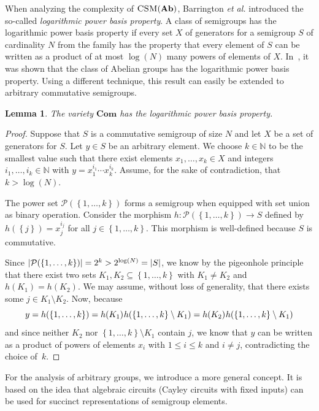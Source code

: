 \documentclass[11pt]{article}
\numberwithin{equation}{section}
\newtheorem{lemma}[theorem]{Lemma}
\theoremstyle{definition}
\theoremstyle{plain}
\newcommand{\N}{\mathbb N}
\renewcommand{\leq}{\leqslant}
\renewcommand{\le}{\leq}
\newcommand{\abs}[1]{\ensuremath\left|#1\right|}
\newcommand{\os}[1]{\ensuremath{\left\{#1\right\}}}
\newcommand{\vAb}{\mathbf{Ab}}
\newcommand{\vCom}{\mathbf{Com}}
\newcommand{\CSM}{\ensuremath{\textsc{CSM}}}
\newcommand{\SLPBP}{logarithmic power basis property}
\newcommand{\ms}{\hspace*{0.5pt}}
\begin{document}
When analyzing the complexity of $\CSM(\vAb)$, Barrington {\it et al.}
introduced the so-called \emph{\SLPBP}. A class of semigroups has the {\SLPBP}
if %
every set $X$ of generators  %
for a semigroup $S$ of cardinality $N$ from the
family has the property that every element of $S$ can be written as a product
of at most $\log(N)$ many powers of elements of $X$.
%
In~\cite{BarringtonKLM01}, it was shown that the class of Abelian groups has
the {\SLPBP}. Using a different technique, this result can easily be extended to
arbitrary commutative semigroups.

\begin{lemma}
  The variety $\vCom$ has the {\SLPBP}.
  \label{lem:com}
\end{lemma}
%
\begin{proof}
  Suppose that $S$ is a commutative semigroup of size $N$ and let $X$ be a set
  of generators for $S$.
  Let $y \in S$ be an arbitrary element.
  We choose $k \in \N$ to be the smallest value such that there exist elements
  $x_1, \dots, x_k \in X$ and integers $i_1, \dots, i_k \in \N$ with $y =
  x_1^{i_1} \cdots x_k^{i_k}$.
  Assume, for the sake of contradiction, that $k > \log(N)$.

  The power set $\mathcal{P}(\os{1, \dots, k})$ forms a semigroup when equipped
  with set union as binary operation.
  Consider the morphism $h \colon \mathcal{P}(\os{1, \dots, k}) \to S$ defined
  by $h(\os{j}) = x_j^{i_j}$ for all $j \in \os{1, \dots, k}$. This morphism is
  well-defined because $S$ is commutative.

  Since $\abs{\mathcal{P}(\os{1, \dots, k})} = 2^k > 2^{\log(N)} = \abs{S}$, we
  know by the pigeonhole principle that there exist two sets $K_1, K_2
  \subseteq \os{1, \dots, k}$ with $K_1 \ne K_2$ and $h(K_1) = h(K_2)$. We may
  assume, without loss of generality, that there exists some $j \in K_1
  \setminus K_2$.
  Now, because
  \begin{equation*}
    y = h(\os{1, \dots, k}) = h(K_1) \ms h(\os{1, \dots, k} \setminus K_1) = h(K_2) \ms h(\os{1, \dots, k} \setminus K_1)
  \end{equation*}
  and since neither $K_2$ nor $\os{1, \dots, k} \setminus K_1$ contain $j$, we
  know that $y$ can be written as a product of powers of elements $x_i$ with $1
  \le i \le k$ and $i \ne j$, contradicting the choice of~$k$.
\end{proof}

For the analysis of arbitrary groups, we introduce a more general concept. It
is based on the idea that algebraic circuits (Cayley circuits with fixed
inputs) can be used for succinct representations of semigroup elements.
\end{document}
